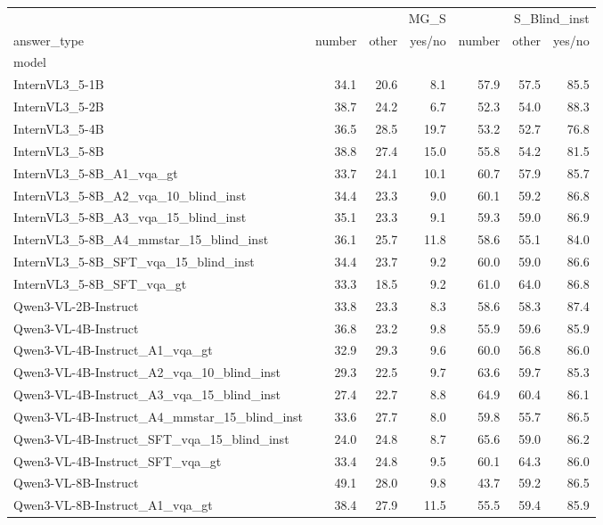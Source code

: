 \begin{tabular}{lrrrrrr}
\toprule
 & \multicolumn{3}{r}{MG_S} & \multicolumn{3}{r}{S_Blind_inst} \\
answer_type & number & other & yes/no & number & other & yes/no \\
model &  &  &  &  &  &  \\
\midrule
InternVL3_5-1B & 34.1 & 20.6 & 8.1 & 57.9 & 57.5 & 85.5 \\
InternVL3_5-2B & 38.7 & 24.2 & 6.7 & 52.3 & 54.0 & 88.3 \\
InternVL3_5-4B & 36.5 & 28.5 & 19.7 & 53.2 & 52.7 & 76.8 \\
InternVL3_5-8B & 38.8 & 27.4 & 15.0 & 55.8 & 54.2 & 81.5 \\
InternVL3_5-8B_A1_vqa_gt & 33.7 & 24.1 & 10.1 & 60.7 & 57.9 & 85.7 \\
InternVL3_5-8B_A2_vqa_10_blind_inst & 34.4 & 23.3 & 9.0 & 60.1 & 59.2 & 86.8 \\
InternVL3_5-8B_A3_vqa_15_blind_inst & 35.1 & 23.3 & 9.1 & 59.3 & 59.0 & 86.9 \\
InternVL3_5-8B_A4_mmstar_15_blind_inst & 36.1 & 25.7 & 11.8 & 58.6 & 55.1 & 84.0 \\
InternVL3_5-8B_SFT_vqa_15_blind_inst & 34.4 & 23.7 & 9.2 & 60.0 & 59.0 & 86.6 \\
InternVL3_5-8B_SFT_vqa_gt & 33.3 & 18.5 & 9.2 & 61.0 & 64.0 & 86.8 \\
Qwen3-VL-2B-Instruct & 33.8 & 23.3 & 8.3 & 58.6 & 58.3 & 87.4 \\
Qwen3-VL-4B-Instruct & 36.8 & 23.2 & 9.8 & 55.9 & 59.6 & 85.9 \\
Qwen3-VL-4B-Instruct_A1_vqa_gt & 32.9 & 29.3 & 9.6 & 60.0 & 56.8 & 86.0 \\
Qwen3-VL-4B-Instruct_A2_vqa_10_blind_inst & 29.3 & 22.5 & 9.7 & 63.6 & 59.7 & 85.3 \\
Qwen3-VL-4B-Instruct_A3_vqa_15_blind_inst & 27.4 & 22.7 & 8.8 & 64.9 & 60.4 & 86.1 \\
Qwen3-VL-4B-Instruct_A4_mmstar_15_blind_inst & 33.6 & 27.7 & 8.0 & 59.8 & 55.7 & 86.5 \\
Qwen3-VL-4B-Instruct_SFT_vqa_15_blind_inst & 24.0 & 24.8 & 8.7 & 65.6 & 59.0 & 86.2 \\
Qwen3-VL-4B-Instruct_SFT_vqa_gt & 33.4 & 24.8 & 9.5 & 60.1 & 64.3 & 86.0 \\
Qwen3-VL-8B-Instruct & 49.1 & 28.0 & 9.8 & 43.7 & 59.2 & 86.5 \\
Qwen3-VL-8B-Instruct_A1_vqa_gt & 38.4 & 27.9 & 11.5 & 55.5 & 59.4 & 85.9 \\

\end{tabular}
